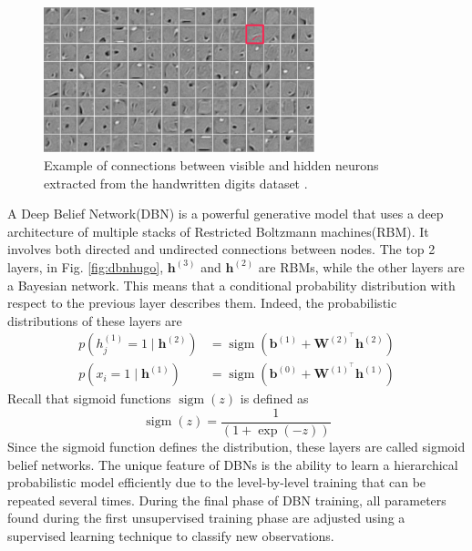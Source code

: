 \begin{figure}
    \centering
    \includegraphics[width=0.7\textwidth]{Images/mnistrbm.png}
    \caption[RBM connection matrixes.]{Example of connections between visible and hidden neurons extracted from the handwritten digits dataset \cite{hugo_larochelle_neural_2013}.}
    \label{fig:minstbrm}
\end{figure}
A Deep Belief Network(DBN) is a powerful generative model that uses a deep architecture of multiple stacks of Restricted Boltzmann machines(RBM). It involves both directed and undirected connections between nodes. The top 2 layers, in Fig. \ref{fig:dbnhugo}, $\mathbf{h}^{(3)}$ and $\mathbf{h}^{(2)}$ are RBMs, while the other layers are a Bayesian network. This means that a conditional probability distribution with respect to the previous layer describes them. Indeed, the probabilistic distributions of these layers are
\begin{equation}
\begin{aligned}
p\left(h_j^{(1)}=1 \mid \mathbf{h}^{(2)}\right) & =\operatorname{sigm}\left(\mathbf{b}^{(1)}+\mathbf{W}^{(2)^{\top}} \mathbf{h}^{(2)}\right) \\
p\left(x_i=1 \mid \mathbf{h}^{(1)}\right) & =\operatorname{sigm}\left(\mathbf{b}^{(0)}+\mathbf{W}^{(1)^{\top}} \mathbf{h}^{(1)}\right)
\end{aligned}
\end{equation}
Recall that sigmoid functions $\operatorname{sigm}(z)$ is defined as
\begin{equation}
\operatorname{sigm}(z)=\frac{1}{(1+\exp (-z))}
\end{equation}
Since the sigmoid function defines the distribution, these layers are called sigmoid belief networks. The unique feature of DBNs is the ability to learn a hierarchical probabilistic model efficiently due to the level-by-level training that can be repeated several times. During the final phase of DBN training, all parameters found during the first unsupervised training phase are adjusted using a supervised learning technique to classify new observations.

